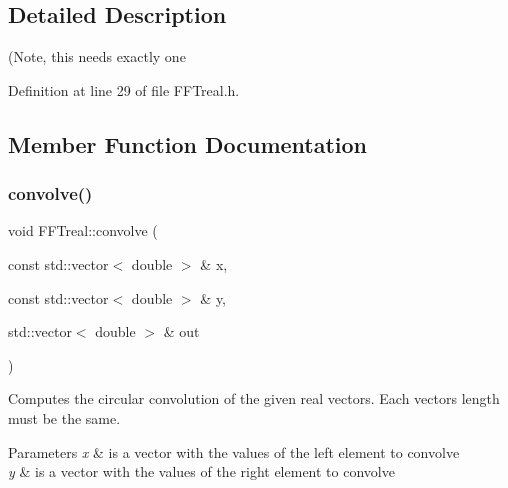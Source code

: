 \subsection{Detailed Description}
(Note, this needs exactly one 

Definition at line 29 of file F\+F\+Treal.\+h.



\subsection{Member Function Documentation}
\mbox{\label{class_f_f_treal_a8c7ae7505d1c80b4471a30585801d64b}} 
\subsubsection{\texorpdfstring{convolve()}{convolve()}\hspace{0.1cm}{\footnotesize\ttfamily [1/2]}}
{\footnotesize\ttfamily void F\+F\+Treal\+::convolve (\begin{DoxyParamCaption}\item[{const std\+::vector$<$ double $>$ \&}]{x,  }\item[{const std\+::vector$<$ double $>$ \&}]{y,  }\item[{std\+::vector$<$ double $>$ \&}]{out }\end{DoxyParamCaption})}



Computes the circular convolution of the given real vectors. Each vector\textquotesingle{}s length must be the same. 


\begin{DoxyParams}{Parameters}
{\em x} & is a vector with the values of the left element to convolve \\
\hline
{\em y} & is a vector with the values of the right element to convolve \\
\hline
\end{DoxyParams}
\mbox{\label{class_f_f_treal_a375983c9725f461611341061dbdcc92f}} 

